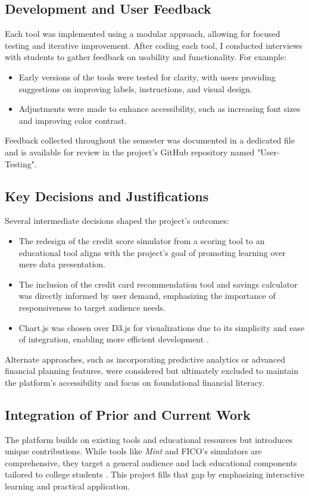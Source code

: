 \documentclass[11pt,twocolumn]{article}
\begin{document}
\subsection{Development and User Feedback}
Each tool was implemented using a modular approach, allowing for focused testing and iterative improvement. After coding each tool, I conducted interviews with students to gather feedback on usability and functionality. For example:
\begin{itemize}
    \item Early versions of the tools were tested for clarity, with users providing suggestions on improving labels, instructions, and visual design.
    \item Adjustments were made to enhance accessibility, such as increasing font sizes and improving color contrast.
\end{itemize}

Feedback collected throughout the semester was documented in a dedicated file and is available for review in the project’s GitHub repository named "User-Testing". 

\subsection{Key Decisions and Justifications}
Several intermediate decisions shaped the project’s outcomes:
\begin{itemize}
    \item The redesign of the credit score simulator from a scoring tool to an educational tool aligns with the project’s goal of promoting learning over mere data presentation.
    \item The inclusion of the credit card recommendation tool and savings calculator was directly informed by user demand, emphasizing the importance of responsiveness to target audience needs.
    \item Chart.js was chosen over D3.js for visualizations due to its simplicity and ease of integration, enabling more efficient development \cite{chartjs}.
\end{itemize}

Alternate approaches, such as incorporating predictive analytics or advanced financial planning features, were considered but ultimately excluded to maintain the platform’s accessibility and focus on foundational financial literacy.

\subsection{Integration of Prior and Current Work}
The platform builds on existing tools and educational resources but introduces unique contributions. While tools like \textit{Mint} and FICO’s simulators are comprehensive, they target a general audience and lack educational components tailored to college students \cite{mint, fico}. This project fills that gap by emphasizing interactive learning and practical application.
\end{document}
